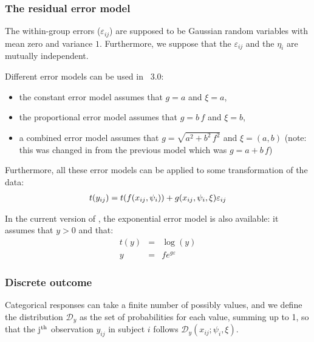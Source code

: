 \subsubsection*{The residual error model} %
The within-group errors ($\varepsilon_{ij}$)  are  supposed  to be  Gaussian random variables  with mean  zero and variance $1$.
Furthermore, we suppose that the $\varepsilon_{ij}$ and the $\eta_{i}$ are mutually independent.

Different error models can be used in \monolix~3.0:
\begin{itemize}
\item the constant error model assumes that $g=a$ and $\xi=a$,
\item the proportional error model assumes that $g=b\,f$ and $\xi=b$,
\item a combined error model assumes that $g=\sqrt{a^2+b^2\,f^2}$ and $\xi=(a,b)$ (note: this was changed in from the previous model which was $g=a+b\,f$)
\end{itemize}

Furthermore, all these error models can be applied to some transformation of the data:
\begin{eqnarray}\label{def_t}
t(y_{ij})=t(f(x_{ij},{\psi_i}))+ g(x_{ij},{\psi_i},\xi)\varepsilon_{ij}
\end{eqnarray}

In the current version of \monolix, the exponential error model is also available: it assumes that $y>0$ and that:
\begin{eqnarray*}
t(y) &=& \log(y) \\
y&=&f e^{g\varepsilon}
\end{eqnarray*}

\subsubsection{Discrete outcome}

Categorical responses can take a finite number of possibly values, and we define the distribution $\mathcal{D}_y$ as the set of probabilities for each value, summing up to 1, so that the j$^{\rm th}$ observation $y_{ij}$ in subject $i$ follows $\mathcal{D}_y\left(x_{ij}; \psi_i, \xi \right)$. 

